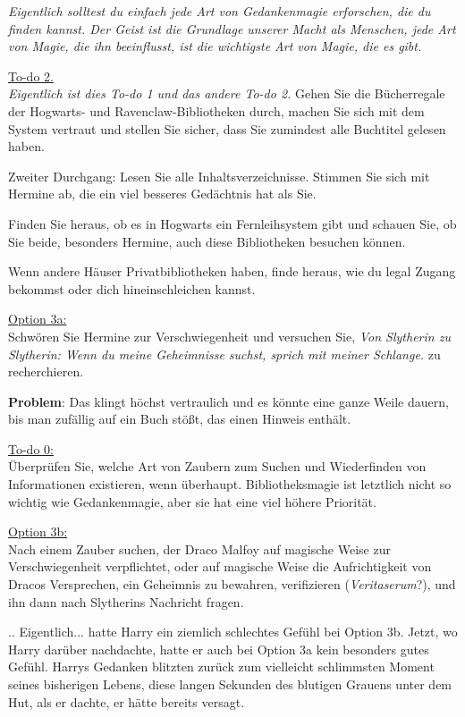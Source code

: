 \emph{Eigentlich solltest du einfach jede Art von Gedankenmagie erforschen, die
du finden kannst. Der Geist ist die Grundlage unserer Macht als Menschen, jede
Art von Magie, die ihn beeinflusst, ist die wichtigste Art von Magie, die es
gibt.}

\underline{To-do 2.}\\
\emph{Eigentlich ist dies To-do 1 und das andere To-do 2. } Gehen Sie die
Bücherregale der Hogwarts- und Ravenclaw-Bibliotheken durch, machen Sie sich mit
dem System vertraut und stellen Sie sicher, dass Sie zumindest alle Buchtitel
gelesen haben.

Zweiter Durchgang: Lesen Sie alle Inhaltsverzeichnisse. Stimmen Sie sich mit
Hermine ab, die ein viel besseres Gedächtnis hat als Sie.

Finden Sie heraus, ob es in Hogwarts ein Fernleihsystem gibt und schauen Sie, ob
Sie beide, besonders Hermine, auch diese Bibliotheken besuchen können.

Wenn andere Häuser Privatbibliotheken haben, finde heraus, wie du legal Zugang
bekommst oder dich hineinschleichen kannst.

\underline{Option 3a:}\\
Schwören Sie Hermine zur Verschwiegenheit und versuchen Sie, \glqq \emph{Von
Slytherin zu Slytherin: Wenn du meine Geheimnisse suchst, sprich mit meiner
Schlange.}\grqq{} zu recherchieren.

\textbf{Problem}: Das klingt höchst vertraulich und es könnte eine ganze Weile
dauern, bis man zufällig auf ein Buch stößt, das einen Hinweis enthält.

\underline{To-do 0:}\\
Überprüfen Sie, welche Art von Zaubern zum Suchen und Wiederfinden von
Informationen existieren, wenn überhaupt. Bibliotheksmagie ist letztlich nicht
so wichtig wie Gedankenmagie, aber sie hat eine viel höhere Priorität.

\underline{Option 3b:}\\
Nach einem Zauber suchen, der Draco Malfoy auf magische Weise zur
Verschwiegenheit verpflichtet, oder auf magische Weise die Aufrichtigkeit von
Dracos Versprechen, ein Geheimnis zu bewahren, verifizieren
(\emph{Veritaserum}?), und ihn dann nach Slytherins Nachricht fragen.

.. Eigentlich... hatte Harry ein ziemlich schlechtes Gefühl bei Option 3b.
Jetzt, wo Harry darüber nachdachte, hatte er auch bei Option 3a kein besonders
gutes Gefühl. Harrys Gedanken blitzten zurück zum vielleicht schlimmsten Moment
seines bisherigen Lebens, diese langen Sekunden des blutigen Grauens unter dem
Hut, als er dachte, er hätte bereits versagt.

